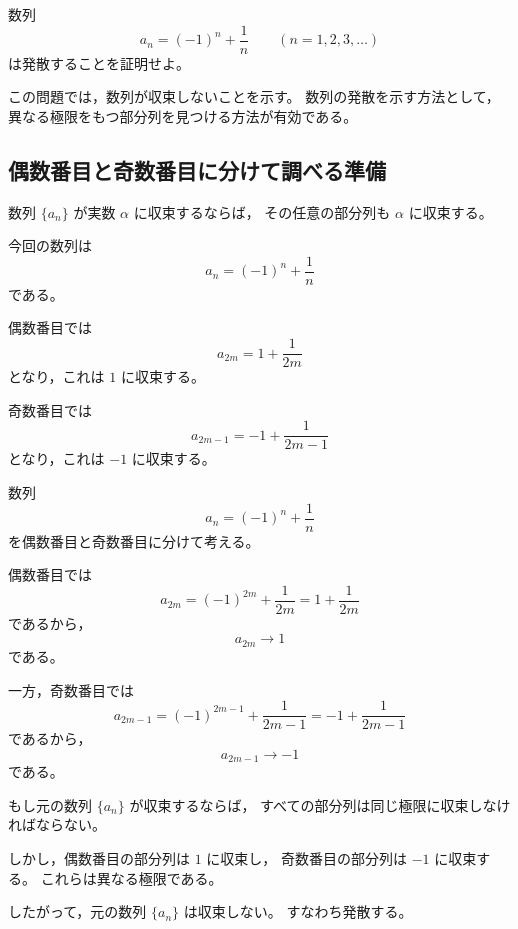 \begin{exercise}
	数列
	\[
	a_n=(-1)^n+\frac{1}{n}
	\qquad
	(n=1,2,3,\ldots)
	\]
	は発散することを証明せよ。
\end{exercise}
\begin{background}
	この問題では，数列が収束しないことを示す。
	数列の発散を示す方法として，異なる極限をもつ部分列を見つける方法が有効である。
	
	\subsection{偶数番目と奇数番目に分けて調べる準備}
	
	\begin{theorem}[収束列の部分列]
		数列 $\{a_n\}$ が実数 $\alpha$ に収束するならば，
		その任意の部分列も $\alpha$ に収束する。
	\end{theorem}
	
	\begin{remark}
		今回の数列は
		\[
		a_n=(-1)^n+\frac{1}{n}
		\]
		である。
		
		偶数番目では
		\[
		a_{2m}=1+\frac{1}{2m}
		\]
		となり，これは $1$ に収束する。
		
		奇数番目では
		\[
		a_{2m-1}=-1+\frac{1}{2m-1}
		\]
		となり，これは $-1$ に収束する。
	\end{remark}
\end{background}
\begin{strategy}
	数列
	\[
	a_n=(-1)^n+\frac{1}{n}
	\]
	を偶数番目と奇数番目に分けて考える。
	
	偶数番目では
	\[
	a_{2m}=(-1)^{2m}+\frac{1}{2m}
	=
	1+\frac{1}{2m}
	\]
	であるから，
	\[
	a_{2m}\to 1
	\]
	である。
	
	一方，奇数番目では
	\[
	a_{2m-1}=(-1)^{2m-1}+\frac{1}{2m-1}
	=
	-1+\frac{1}{2m-1}
	\]
	であるから，
	\[
	a_{2m-1}\to -1
	\]
	である。
	
	もし元の数列 $\{a_n\}$ が収束するならば，
	すべての部分列は同じ極限に収束しなければならない。
	
	しかし，偶数番目の部分列は $1$ に収束し，
	奇数番目の部分列は $-1$ に収束する。
	これらは異なる極限である。
	
	したがって，元の数列 $\{a_n\}$ は収束しない。
	すなわち発散する。
\end{strategy}